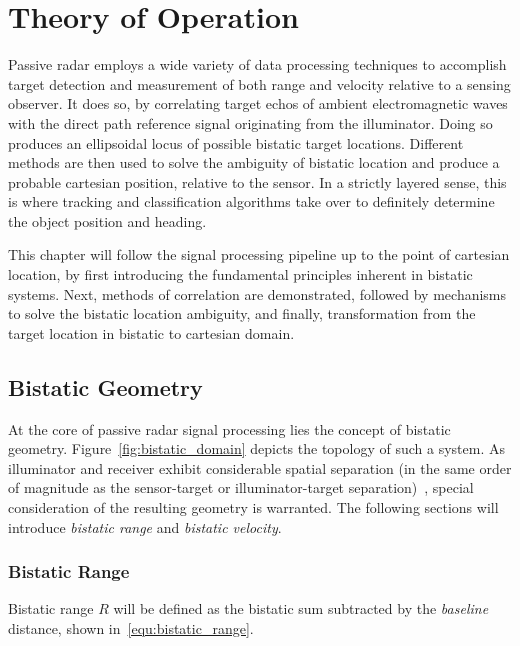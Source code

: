\chapter{Theory of Operation}\label{chp:theory_of_operation}

Passive radar employs a wide variety of data processing techniques to accomplish target detection and measurement of both range and velocity relative to a sensing observer. It does so, by correlating target echos of ambient electromagnetic waves with the direct path reference signal originating from the illuminator. Doing so produces an ellipsoidal locus of possible bistatic target locations. Different methods are then used to solve the ambiguity of bistatic location and produce a probable cartesian position, relative to the sensor. In a strictly layered sense, this is where tracking and classification algorithms take over to definitely determine the object position and heading.

This chapter will follow the signal processing pipeline up to the point of cartesian location, by first introducing the fundamental principles inherent in bistatic systems. Next, methods of correlation are demonstrated, followed by mechanisms to solve the bistatic location ambiguity, and finally, transformation from the target location in bistatic to cartesian domain.

\section{Bistatic Geometry}

At the core of passive radar signal processing lies the concept of bistatic geometry. Figure~\ref{fig:bistatic_domain} depicts the topology of such a system. As illuminator and receiver exhibit considerable spatial separation (in the same order of magnitude as the sensor-target or illuminator-target separation)~\cite[p.~1571]{Griffiths2010}, special consideration of the resulting geometry is warranted. The following sections will introduce \emph{bistatic range} and \emph{bistatic velocity}.

\subsection{Bistatic Range}

Bistatic range \(R\) will be defined as the bistatic sum subtracted by the \emph{baseline} distance, shown in~\ref{equ:bistatic_range}.~\cite[p.~10]{Malanowski2019}

